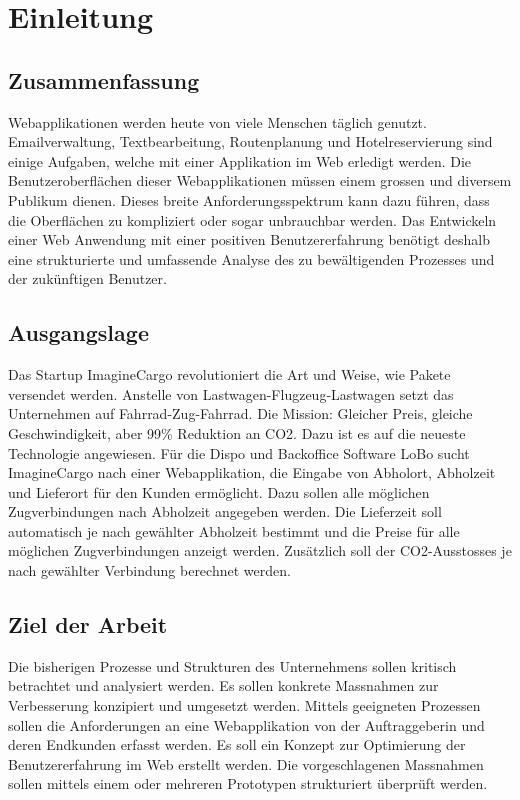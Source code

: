 \chapter{Einleitung}
\label{sec:Einleitung}

\section{Zusammenfassung}
\label{sec:zusammenfassung}
Webapplikationen werden heute von viele Menschen täglich genutzt. Emailverwaltung, Textbearbeitung, Routenplanung und Hotelreservierung sind einige Aufgaben, welche mit einer Applikation im Web erledigt werden. Die Benutzeroberflächen dieser Webapplikationen müssen einem grossen und diversem Publikum dienen. Dieses breite Anforderungsspektrum kann dazu führen, dass die Oberflächen zu kompliziert oder sogar unbrauchbar werden. Das Entwickeln einer Web Anwendung mit einer positiven Benutzererfahrung benötigt deshalb eine strukturierte und umfassende Analyse des zu bewältigenden Prozesses und der zukünftigen Benutzer.

\section{Ausgangslage}
\label{sec:ausgangslage}
Das Startup ImagineCargo revolutioniert die Art und Weise, wie Pakete versendet werden. Anstelle von Lastwagen-Flugzeug-Lastwagen setzt das Unternehmen auf Fahrrad-Zug-Fahrrad. Die Mission: Gleicher  Preis, gleiche Geschwindigkeit, aber 99\% Reduktion an CO2. Dazu ist es auf die neueste Technologie angewiesen. Für die Dispo und Backoffice Software LoBo sucht ImagineCargo nach einer Webapplikation, die Eingabe von Abholort, Abholzeit und Lieferort für den Kunden ermöglicht. Dazu sollen alle möglichen Zugverbindungen nach Abholzeit angegeben werden. Die Lieferzeit soll automatisch je nach gewählter Abholzeit bestimmt und die Preise für alle möglichen Zugverbindungen anzeigt werden. Zusätzlich soll der CO2-Ausstosses je nach gewählter Verbindung berechnet werden.


\section{Ziel der Arbeit}
\label{sec:zielderarbeit}
Die bisherigen Prozesse und Strukturen des Unternehmens sollen kritisch betrachtet und analysiert werden. Es sollen konkrete Massnahmen zur Verbesserung konzipiert und umgesetzt werden. Mittels geeigneten Prozessen sollen die Anforderungen an eine Webapplikation von der Auftraggeberin und deren Endkunden erfasst werden. Es soll ein Konzept zur Optimierung der Benutzererfahrung im Web erstellt werden. Die vorgeschlagenen Massnahmen sollen mittels einem oder mehreren Prototypen strukturiert überprüft werden.

